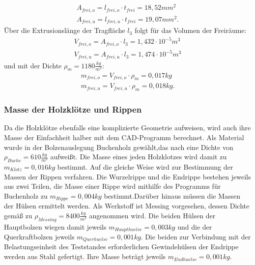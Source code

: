 \begin{equation}
\begin{array}{l}
		A_{frei,o}=l_{frei,o}\cdot t_{frei}=18,52mm^{2} \\
		A_{frei,u}=l_{frei,u}\cdot t_{frei}=19,07mm^{2}.
\end{array}
\end{equation}
Über die Extrusionslänge der Tragfläche $ l_{3} $ folgt für das Volumen der Freiräume:
\begin{equation}
	\begin{array}{l}
		V_{frei,o}=A_{frei,o}\cdot l_{3}= 1,432\cdot 10^{-5}m^{3} \\
		V_{frei,u}=A_{frei,u}\cdot l_{3}= 1,474\cdot 10^{-5}m^{3} 
	\end{array}
\end{equation}
und mit der Dichte $ \rho_{m}=1180\frac{kg}{m^{3}} $:
\begin{equation}
	\begin{array}{l}
		m_{frei,o}=V_{frei,o}\cdot \rho_{m}=0,017kg\\
		m_{frei,u}=V_{frei,u}\cdot \rho_{m}=0,018kg.
	\end{array}
\end{equation}

\subsubsection{Masse der Holzklötze und Rippen}
Da die Holzklötze ebenfalls eine komplizierte Geometrie aufweisen, wird auch ihre Masse der Einfachheit halber mit dem CAD-Programm berechnet. Als Material wurde in der Bolzenauslegung Buchenholz gewählt,das nach \cite{item19} eine Dichte von $ \rho_{Buche}=610\frac{kg}{m^{3}} $ aufweißt. Die Masse eines jeden Holzklotzes wird damit zu $ m_{Klotz}=0,016kg $ bestimmt.
Auf die gleiche Weise wird zur Bestimmung der Massen der Rippen verfahren. Die Wurzelrippe und die Endrippe bestehen jeweils aus zwei Teilen, die Masse einer Rippe wird mithilfe des Programms für Buchenholz zu $ m_{Rippe}=0,004kg $ bestimmt.Darüber hinaus müssen die Massen der Hülsen ermittelt werden. Als Werkstoff ist Messing vorgesehen, dessen Dichte gemäß \cite{item20} zu $ \rho_{Messing}=8400\frac{kg}{m^{3}} $ angenommen wird. Die beiden Hülsen der Hauptbolzen wiegen damit jeweils $ m_{Haupthuelse}=0,003kg $ und die der Querkraftbolzen jeweils $ m_{Querhuelse}=0,001kg $. Die beiden zur Verbindung mit der Belastungseinheit des Teststandes erforderlichen Gewindehülsen der Endrippe werden aus Stahl gefertigt. Ihre Masse beträgt jeweils $ m_{Endhuelse}=0,001kg $.

